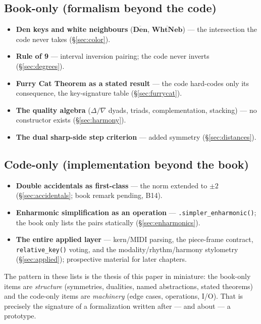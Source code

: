 \documentclass[11pt]{article}
\newcommand{\DN}{\overline{\textbf{Den}}}       %
\newcommand{\WN}{\overline{\textbf{WhtNeb}}}    %
\newcommand{\Maj}{\Delta}                       %
\newcommand{\Min}{\nabla}                       %
\theoremstyle{definition}
\theoremstyle{remark}
\newcommand{\code}[1]{\texttt{#1}}
\begin{document}
\subsection*{Book-only (formalism beyond the code)}
\begin{itemize}[leftmargin=2em]
  \item \textbf{Den keys and white neighbours} ($\DN$, $\WN$) --- the
        intersection the code never takes (\S\ref{sec:color}).
  \item \textbf{Rule of 9} --- interval inversion pairing; the code never
        inverts (\S\ref{sec:degrees}).
  \item \textbf{Furry Cat Theorem as a stated result} --- the code hard-codes
        only its consequence, the key-signature table (\S\ref{sec:furrycat}).
  \item \textbf{The quality algebra} ($\Maj/\Min$ dyads, triads,
        complementation, stacking) --- no constructor exists
        (\S\ref{sec:harmony}).
  \item \textbf{The dual sharp-side step criterion} --- added symmetry
        (\S\ref{sec:distances}).
\end{itemize}

\subsection*{Code-only (implementation beyond the book)}
\begin{itemize}[leftmargin=2em]
  \item \textbf{Double accidentals as first-class} --- the norm extended to
        $\pm 2$ (\S\ref{sec:accidentals}; book remark pending, B14).
  \item \textbf{Enharmonic simplification as an operation} ---
        \code{.simpler\_enharmonic()}; the book only lists the pairs statically
        (\S\ref{sec:enharmonics}).
  \item \textbf{The entire applied layer} --- kern/MIDI parsing, the piece-frame
        contract, \code{relative\_key()} voting, and the modality/rhythm/harmony
        stylometry (\S\ref{sec:applied}); prospective material for later
        chapters.
\end{itemize}

The pattern in these lists is the thesis of this paper in miniature: the
book-only items are \emph{structure} (symmetries, dualities, named
abstractions, stated theorems) and the code-only items are \emph{machinery}
(edge cases, operations, I/O). That is precisely the signature of a
formalization written after --- and about --- a prototype.
\end{document}

